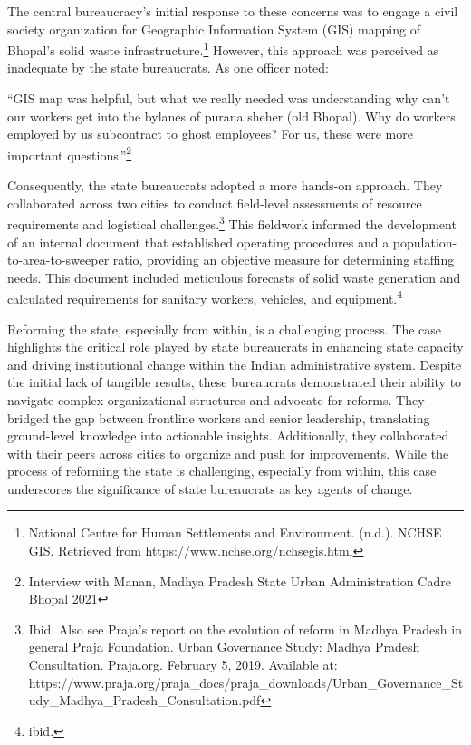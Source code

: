 The central bureaucracy's initial response to these concerns was to engage a civil society organization for Geographic Information System (GIS) mapping of Bhopal's solid waste infrastructure.\footnote{National Centre for Human Settlements and Environment. (n.d.). NCHSE GIS. Retrieved from https://www.nchse.org/nchsegis.html} However, this approach was perceived as inadequate by the state bureaucrats. As one officer noted:

``GIS map was helpful, but what we really needed was understanding why can't our workers get into the bylanes of purana sheher (old Bhopal). Why do workers employed by us subcontract to ghost employees? For us, these were more important questions.''\footnote{Interview with Manan, Madhya Pradesh State Urban Administration Cadre Bhopal 2021}

Consequently, the state bureaucrats adopted a more hands-on approach. They collaborated across two cities to conduct field-level assessments of resource requirements and logistical challenges.\footnote{Ibid. Also see Praja's report on the evolution of reform in Madhya Pradesh in general Praja Foundation. Urban Governance Study: Madhya Pradesh Consultation. Praja.org. February 5, 2019. Available at: https://www.praja.org/praja\_docs/praja\_downloads/Urban\_Governance\_Study\_Madhya\_Pradesh\_Consultation.pdf} This fieldwork informed the development of an internal document that established operating procedures and a population-to-area-to-sweeper ratio, providing an objective measure for determining staffing needs. This document included meticulous forecasts of solid waste generation and calculated requirements for sanitary workers, vehicles, and equipment.\footnote{ibid.}

Reforming the state, especially from within, is a challenging process. The case highlights the critical role played by state bureaucrats in enhancing state capacity and driving institutional change within the Indian administrative system. Despite the initial lack of tangible results, these bureaucrats demonstrated their ability to navigate complex organizational structures and advocate for reforms. They bridged the gap between frontline workers and senior leadership, translating ground-level knowledge into actionable insights. Additionally, they collaborated with their peers across cities to organize and push for improvements. While the process of reforming the state is challenging, especially from within, this case underscores the significance of state bureaucrats as key agents of change.

